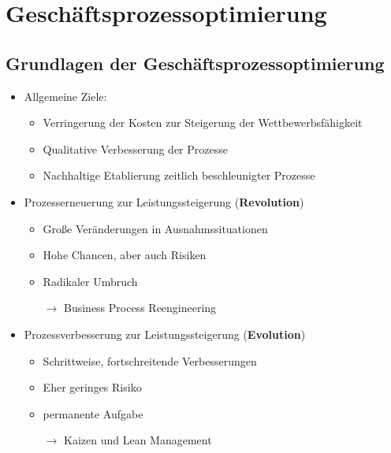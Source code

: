 \section{Geschäftsprozessoptimierung}
\subsection{Grundlagen der Geschäftsprozessoptimierung}
\begin{itemize}
\item Allgemeine Ziele:
	\begin{itemize}
	\item Verringerung der Kosten zur Steigerung der Wettbewerbsfähigkeit
	\item Qualitative Verbesserung der Prozesse
	\item Nachhaltige Etablierung zeitlich beschleunigter Prozesse
	\end{itemize}
\item Prozesserneuerung zur Leistungssteigerung (\textbf{Revolution})
	\begin{itemize}
	\item Große Veränderungen in Ausnahmssituationen
	\item Hohe Chancen, aber auch Risiken
	\item Radikaler Umbruch
	\item[$\rightarrow$] Business Process Reengineering
	\end{itemize}

\item Prozessverbesserung zur Leistungssteigerung (\textbf{Evolution})
	\begin{itemize}
	\item Schrittweise, fortschreitende Verbesserungen
	\item Eher geringes Risiko
	\item permanente Aufgabe
	\item[$\rightarrow$] Kaizen und Lean Management
	\end{itemize}
\end{itemize}

